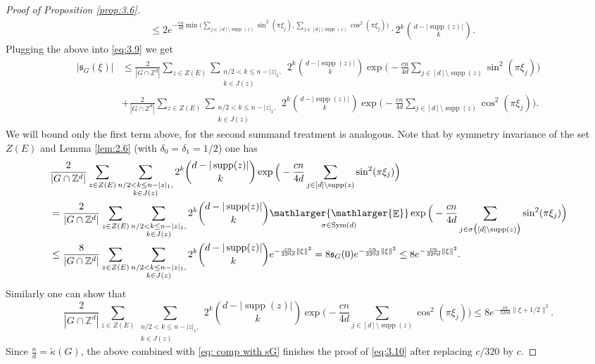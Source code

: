 \documentclass[a4paper,oneside, reqno]{amsart}
\numberwithin{equation}{section}
\theoremstyle{definition}%
\theoremstyle{definition}
\theoremstyle{definition}%
\theoremstyle{definition}
\newcommand{\E}{\mathop{\mathbb{E}}}
\newcommand{\Z}{\mathbb{Z}}
\DeclareMathOperator{\Sym}{Sym}
\DeclareMathOperator{\supp}{supp}
\newcommand{\se}[1]{\underset{_{\substack{#1}}}{\mathlarger{\mathlarger{\E}}}}
\begin{document}
\begin{proof}[Proof of Proposition \ref{prop:3.6}]
\begin{align*}
& \le  2 e^{-\frac{cn}{4d} \min\big( \sum_{j \in [d] \setminus \supp(z)} \sin^2(\pi \xi_j), \sum_{j \in [d] \setminus \supp(z)} \cos^2(\pi \xi_j) \big)} \cdot 2^k \binom{d-|\supp(z)|}{k}.
\end{align*}
Plugging the above into \eqref{eq:3.9} we get
\begin{align*}
    |\mathfrak{s}_G(\xi)| &\le \frac{2}{|G\cap \Z^d|}\sum_{z \in Z(E)} \sum_{\substack{n/2<k \leq n-|z|_1, \\ k \in J(z)}} 2^k \binom{d-|\supp(z)|}{k} \exp\Big(-\frac{cn}{4d} \sum_{j \in [d] \setminus \supp(z)} \sin^2(\pi \xi_j) \Big) \\
    &+ \frac{2}{|G\cap \Z^d|}\sum_{z \in Z(E)}  \sum_{\substack{n/2<k \leq n-|z|_1, \\ k \in J(z)}} 2^k \binom{d-|\supp(z)|}{k} \exp\Big(-\frac{cn}{4d} \sum_{j \in [d] \setminus \supp(z)} \cos^2(\pi \xi_j) \Big).
\end{align*}
We will bound only the first term above, for the second summand treatment is analogous. Note that by symmetry invariance of the set $Z(E)$ and Lemma \ref{lem:2.6} (with $\delta_0=\delta_1=1/2$) one has
\begin{align*}
    &\frac{2}{|G\cap \Z^d|}\sum_{z \in Z(E)} \sum_{\substack{n/2<k \leq n-|z|_1, \\ k \in J(z)}} 2^k \binom{d-|\supp(z)|}{k} \exp\Big(-\frac{cn}{4d} \sum_{j \in [d] \setminus \supp(z)} \sin^2(\pi \xi_j) \Big) \\
    &=\frac{2}{|G\cap \Z^d|}\sum_{z \in Z(E)} \sum_{\substack{n/2<k \leq n-|z|_1, \\ k \in J(z)}} 2^k \binom{d-|\supp(z)|}{k} \se{\sigma \in \Sym(d)} \exp\Big(-\frac{cn}{4d} \sum_{j \in \sigma\big( [d] \setminus \supp(z)\big)} \sin^2(\pi \xi_j) \Big) \\
    &\le \frac{8}{|G\cap \Z^d|}\sum_{z \in Z(E)} \sum_{\substack{n/2<k \leq n-|z|_1, \\ k \in J(z)}} 2^k \binom{d-|\supp(z)|}{k}  e^{- \frac{cn}{320d} \| \xi \|^2}= 8 \mathfrak{s}_G(0)e^{- \frac{cn}{320d} \| \xi \|^2} \le 8 e^{- \frac{cn}{320d} \| \xi \|^2}.
\end{align*}
Similarly one can show that 
\[
\frac{2}{|G\cap \Z^d|}\sum_{z \in Z(E)}  \sum_{\substack{n/2<k \leq n-|z|_1, \\ k \in J(z)}} 2^k \binom{d-|\supp(z)|}{k} \exp\Big(-\frac{cn}{4d} \sum_{j \in [d] \setminus \supp(z)} \cos^2(\pi \xi_j) \Big) \le 8 e^{- \frac{cn}{320d} \| \xi +1/2\|^2}.
\]
Since $\frac{n}{d}=\widetilde{\kappa}(G)$, the above combined with \eqref{eq: comp with sG} finishes the proof of \eqref{eq:3.10} after replacing $c/320$ by $c$. 
\end{proof}
\end{document}
